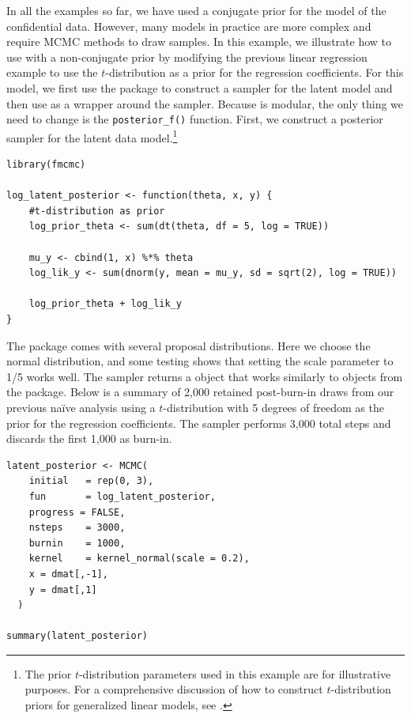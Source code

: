 In all the examples so far, we have used a conjugate prior for the model
of the confidential data. However, many models in practice are more complex and
require MCMC methods to draw samples. In this example, we illustrate how
to use  with a non-conjugate prior by
modifying the previous linear regression example to use the \(t\)-distribution
as a prior for the regression coefficients. For this model, we first use the 
package to construct a sampler for the latent model and then use  as a
wrapper around the  sampler. Because  is
modular, the only thing we need to change is the \texttt{posterior\_f()} function. First,
we construct a posterior sampler for the latent data model.\footnote{The prior
  \(t\)-distribution parameters used in this example are for
  illustrative purposes. For a comprehensive discussion of how to
  construct \(t\)-distribution priors for generalized linear models, see
  \citet{Gelman2008}.}

\begin{verbatim}
library(fmcmc)

log_latent_posterior <- function(theta, x, y) {
    #t-distribution as prior
    log_prior_theta <- sum(dt(theta, df = 5, log = TRUE))
    
    mu_y <- cbind(1, x) %*% theta
    log_lik_y <- sum(dnorm(y, mean = mu_y, sd = sqrt(2), log = TRUE))
    
    log_prior_theta + log_lik_y
}
\end{verbatim}

The  package comes with several proposal distributions. Here
we choose the normal distribution, and some testing shows that setting
the scale parameter to 1/5 works well. The sampler returns a  \citep{coda_pkg}
object that works similarly to objects from the  package.
Below is a summary of 2,000 retained post-burn-in draws from our
previous naïve analysis using a \(t\)-distribution with 5 degrees of freedom as
the prior for the regression coefficients. The sampler performs 3,000 total
steps and discards the first 1,000 as burn-in.

\begin{verbatim}
latent_posterior <- MCMC(
    initial   = rep(0, 3), 
    fun       = log_latent_posterior, 
    progress = FALSE,
    nsteps    = 3000, 
    burnin    = 1000,
    kernel    = kernel_normal(scale = 0.2),
    x = dmat[,-1],
    y = dmat[,1] 
  )

summary(latent_posterior)
\end{verbatim}


